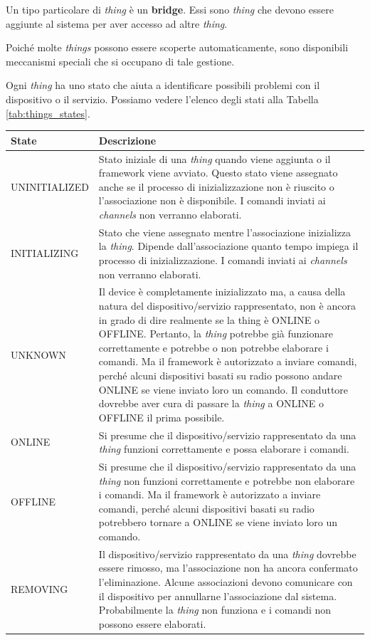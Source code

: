 Un tipo particolare di {\em thing} è un \textbf{bridge}. Essi sono {\em thing} che devono essere aggiunte al sistema per aver accesso ad altre {\em thing}. 

Poiché molte {\em things} possono essere scoperte automaticamente, sono disponibili meccanismi speciali che si occupano di tale gestione.

Ogni {\em thing} ha uno stato che aiuta a identificare possibili problemi con il dispositivo o il servizio. Possiamo vedere l'elenco degli stati alla Tabella \ref{tab:things_states}.

\begin{table}[]
    \centering
    \begin{tabular}{ l | p{10cm} }
        \textbf{State} & \textbf{Descrizione}\\
        \hline
        UNINITIALIZED & Stato iniziale di una {\em thing} quando viene aggiunta o il framework viene avviato. Questo stato viene assegnato anche se il processo di inizializzazione non è riuscito o l'associazione non è disponibile. I comandi inviati ai {\em channels} non verranno elaborati.\\
        INITIALIZING & Stato che viene assegnato mentre l'associazione inizializza la  {\em thing}. Dipende dall'associazione quanto tempo impiega il processo di inizializzazione. I comandi inviati ai {\em channels} non verranno elaborati.\\
        UNKNOWN & Il device è completamente inizializzato ma, a causa della natura del dispositivo/servizio rappresentato, non è ancora in grado di dire realmente se la thing è ONLINE o OFFLINE. Pertanto, la {\em thing} potrebbe già funzionare correttamente e potrebbe o non potrebbe elaborare i comandi. Ma il framework è autorizzato a inviare comandi, perché alcuni dispositivi basati su radio possono andare ONLINE se viene inviato loro un comando. Il conduttore dovrebbe aver cura di passare la {\em thing} a ONLINE o OFFLINE il prima possibile.\\
        ONLINE & Si presume che il dispositivo/servizio rappresentato da una {\em thing} funzioni correttamente e possa elaborare i comandi.\\
        OFFLINE & Si presume che il dispositivo/servizio rappresentato da una {\em thing} non funzioni correttamente e potrebbe non elaborare i comandi. Ma il framework è autorizzato a inviare comandi, perché alcuni dispositivi basati su radio potrebbero tornare a ONLINE se viene inviato loro un comando.\\
        REMOVING & Il dispositivo/servizio rappresentato da una {\em thing} dovrebbe essere rimosso, ma l'associazione non ha ancora confermato l'eliminazione. Alcune associazioni devono comunicare con il dispositivo per annullarne l'associazione dal sistema. Probabilmente la {\em thing} non funziona e i comandi non possono essere elaborati.\\

\end{tabular}
\end{table}
